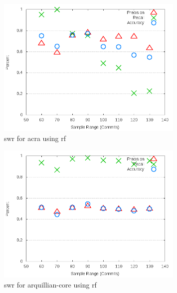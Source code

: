 \begin{figure}
\centering
\includegraphics[width=0.8\textwidth]{images/rf/test_1/acra_sample_range.png}
\caption{\gls{swr} for acra using \gls{rf}}
\label{fig:test_1_acra_rf}
\end{figure}

\begin{figure}
\centering
\includegraphics[width=0.8\textwidth]{images/rf/test_1/arquillian-core_sample_range.png}
\caption{\gls{swr} for arquillian-core using \gls{rf}}
\label{fig:test_1_arquillian-core_rf}
\end{figure}

\clearpage

